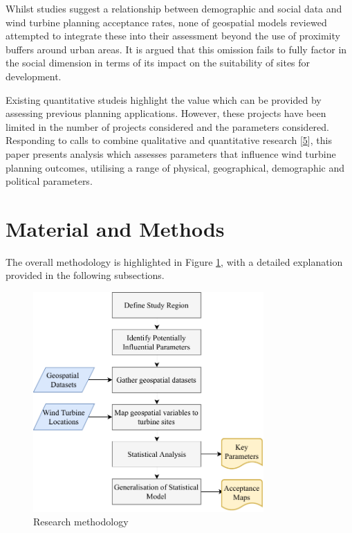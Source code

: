 \documentclass[a4paper,]{article}
\theoremstyle{definition}
\theoremstyle{definition}
\theoremstyle{definition}
\theoremstyle{remark}
\begin{document}
Whilst studies suggest a relationship between demographic and social
data and wind turbine planning acceptance rates, none of geospatial
models reviewed attempted to integrate these into their assessment
beyond the use of proximity buffers around urban areas. It is argued
that this omission fails to fully factor in the social dimension in
terms of its impact on the suitability of sites for development.

Existing quantitative studeis highlight the value which can be provided
by assessing previous planning applications. However, these projects
have been limited in the number of projects considered and the
parameters considered. Responding to calls to combine qualitative and
quantitative research {[}\protect\hyperlink{ref-Langer2016}{5}{]}, this
paper presents analysis which assesses parameters that influence wind
turbine planning outcomes, utilising a range of physical, geographical,
demographic and political parameters.

\section{Material and Methods}\label{material-and-methods}

The overall methodology is highlighted in Figure \ref{fig:Methodology},
with a detailed explanation provided in the following subsections.

\begin{figure}[h]

{\centering \includegraphics[width=8.8cm]{_figures/Flowchart/ResearchApproach} 

}

\caption{Research methodology}\label{fig:Methodology}
\end{figure}
\end{document}
